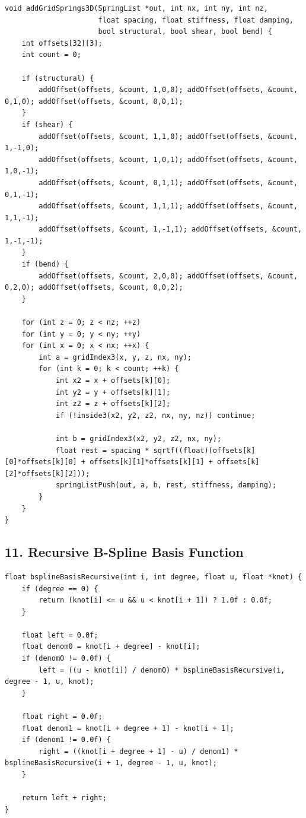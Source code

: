 \documentclass[10pt,letterpaper]{article}
\begin{document}
\begin{verbatim}
void addGridSprings3D(SpringList *out, int nx, int ny, int nz,
                      float spacing, float stiffness, float damping,
                      bool structural, bool shear, bool bend) {
    int offsets[32][3];
    int count = 0;

    if (structural) {
        addOffset(offsets, &count, 1,0,0); addOffset(offsets, &count, 0,1,0); addOffset(offsets, &count, 0,0,1);
    }
    if (shear) {
        addOffset(offsets, &count, 1,1,0); addOffset(offsets, &count, 1,-1,0);
        addOffset(offsets, &count, 1,0,1); addOffset(offsets, &count, 1,0,-1);
        addOffset(offsets, &count, 0,1,1); addOffset(offsets, &count, 0,1,-1);
        addOffset(offsets, &count, 1,1,1); addOffset(offsets, &count, 1,1,-1);
        addOffset(offsets, &count, 1,-1,1); addOffset(offsets, &count, 1,-1,-1);
    }
    if (bend) {
        addOffset(offsets, &count, 2,0,0); addOffset(offsets, &count, 0,2,0); addOffset(offsets, &count, 0,0,2);
    }

    for (int z = 0; z < nz; ++z)
    for (int y = 0; y < ny; ++y)
    for (int x = 0; x < nx; ++x) {
        int a = gridIndex3(x, y, z, nx, ny);
        for (int k = 0; k < count; ++k) {
            int x2 = x + offsets[k][0];
            int y2 = y + offsets[k][1];
            int z2 = z + offsets[k][2];
            if (!inside3(x2, y2, z2, nx, ny, nz)) continue;

            int b = gridIndex3(x2, y2, z2, nx, ny);
            float rest = spacing * sqrtf((float)(offsets[k][0]*offsets[k][0] + offsets[k][1]*offsets[k][1] + offsets[k][2]*offsets[k][2]));
            springListPush(out, a, b, rest, stiffness, damping);
        }
    }
}
\end{verbatim}

\subsection*{11. Recursive B-Spline Basis Function}

\begin{verbatim}
float bsplineBasisRecursive(int i, int degree, float u, float *knot) {
    if (degree == 0) {
        return (knot[i] <= u && u < knot[i + 1]) ? 1.0f : 0.0f;
    }

    float left = 0.0f;
    float denom0 = knot[i + degree] - knot[i];
    if (denom0 != 0.0f) {
        left = ((u - knot[i]) / denom0) * bsplineBasisRecursive(i, degree - 1, u, knot);
    }

    float right = 0.0f;
    float denom1 = knot[i + degree + 1] - knot[i + 1];
    if (denom1 != 0.0f) {
        right = ((knot[i + degree + 1] - u) / denom1) * bsplineBasisRecursive(i + 1, degree - 1, u, knot);
    }

    return left + right;
}
\end{verbatim}
\end{document}
